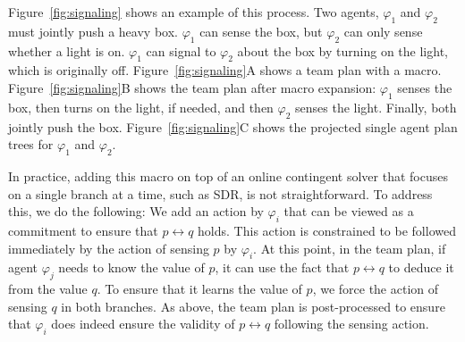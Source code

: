 \documentclass[letterpaper]{article} %
\theoremstyle{definition}
\begin{document}
Figure~\ref{fig:signaling} shows an example of this process. Two agents, $\varphi_1$ and $\varphi_2$ must jointly push a heavy box. $\varphi_1$ can sense the box, but $\varphi_2$ can only sense whether a light is on. $\varphi_1$ can  signal to $\varphi_2$ about the box by turning on the light, which is originally off. Figure~\ref{fig:signaling}A shows a team plan with a macro. 
Figure~\ref{fig:signaling}B shows the team plan after macro expansion: $\varphi_1$ senses the box, then turns on the light, if needed, and then $\varphi_2$ senses the light. Finally, both jointly push the box. 
Figure~\ref{fig:signaling}C shows the projected single agent plan trees for $\varphi_1$ and $\varphi_2$.  %



In practice, adding this macro on top of an online contingent solver that focuses on a single branch at a time, such as SDR, is not straightforward. To address this, we do the following:
We add an action by $\varphi_i$ that can be viewed as a commitment to ensure that $p\leftrightarrow q$ holds. This action is constrained to be followed immediately by the action of sensing $p$ by $\varphi_i$.
At this point, in the team plan, if agent $\varphi_j$ needs to know the value of $p$, it can use the fact that $p\leftrightarrow q$ to deduce it from the value $q$. To ensure that it learns the value of $p$, we force the action of sensing $q$ in both branches. 
As above, the team plan is post-processed to ensure that $\varphi_i$ does indeed ensure the validity of $p\leftrightarrow q$ following the sensing action. 
\end{document}
